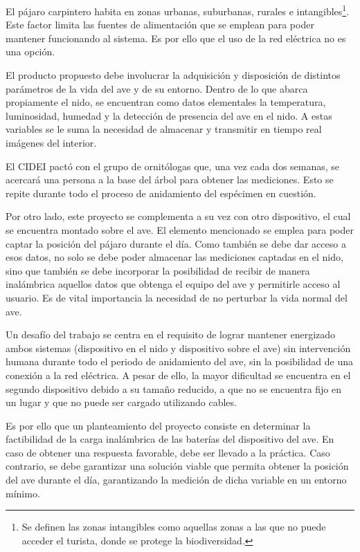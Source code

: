 El pájaro carpintero habita en zonas urbanas, suburbanas, rurales e intangibles\footnote{Se definen las zonas intangibles como aquellas zonas a las que no puede acceder el turista, donde se protege la biodiversidad.}. Este factor limita las fuentes de alimentación que se emplean para poder mantener funcionando al sistema. Es por ello que el uso de la red eléctrica no es una opción.

El producto propuesto debe involucrar la adquisición y disposición de distintos parámetros de la vida del ave y de su entorno. Dentro de lo que abarca propiamente el nido, se encuentran como datos elementales la temperatura, luminosidad, humedad y la detección de presencia del ave en el nido. A estas variables se le suma la necesidad de almacenar y transmitir en tiempo real imágenes del interior.

El CIDEI pactó con el grupo de ornitólogas que, una vez cada dos semanas, se acercará una persona a la base del árbol para obtener las mediciones. Esto se repite durante todo el proceso de anidamiento del espécimen en cuestión. %

Por otro lado, este proyecto se complementa a su vez con otro dispositivo, el cual se encuentra montado sobre el ave. El elemento mencionado se emplea para poder captar la posición del pájaro durante el día. Como también se debe dar acceso a esos datos, no solo se debe poder almacenar las mediciones captadas en el nido, sino que también se debe incorporar la posibilidad de recibir de manera inalámbrica aquellos datos que obtenga el equipo del ave y permitirle acceso al usuario. Es de vital importancia la necesidad de no perturbar la vida normal del ave.


Un desafío del trabajo se centra en el requisito de lograr mantener energizado ambos sistemas (dispositivo en el nido y dispositivo sobre el ave) sin intervención humana durante todo el periodo de anidamiento del ave, sin la posibilidad de una conexión a la red eléctrica. A pesar de ello, la mayor dificultad se encuentra en el segundo dispositivo debido a su tamaño reducido, a que no se encuentra fijo en un lugar y que no puede ser cargado utilizando cables.

Es por ello que un planteamiento del proyecto consiste en determinar la factibilidad de la carga inalámbrica de las baterías del dispositivo del ave. En caso de obtener una respuesta favorable, debe ser llevado a la práctica. Caso contrario, se debe garantizar una solución viable que permita obtener la posición del ave durante el día, garantizando la medición de dicha variable en un entorno mínimo.


